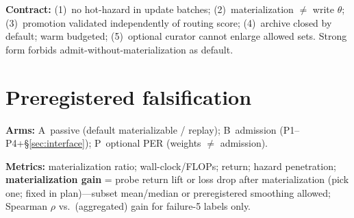 \documentclass{article}
\begin{document}
\textbf{Contract:} (1)~no hot-hazard in update batches; (2)~materialization \(\neq\) write \(\theta\); (3)~promotion validated independently of routing score; (4)~archive closed by default; warm budgeted; (5)~optional curator cannot enlarge allowed sets. Strong form forbids admit-without-materialization as default.

\section{Preregistered falsification}
\label{sec:falsification}

\textbf{Arms:} A~passive (default materializable / replay); B~admission (P1--P4+\S\ref{sec:interface}); P~optional PER (weights \(\neq\) admission).

\textbf{Metrics:} materialization ratio; wall-clock/FLOPs; return; hazard penetration; \textbf{materialization gain} = probe return lift or loss drop after materialization (pick one; fixed in plan)---subset mean/median or preregistered smoothing allowed; Spearman \(\rho\) vs.\ (aggregated) gain for failure-5 labels only.
\end{document}
